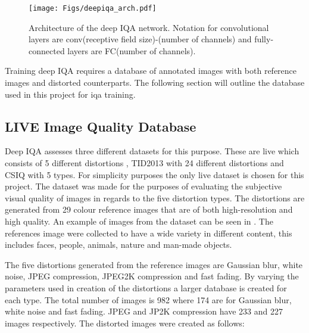 \documentclass[a4paper,twoside]{article}
\begin{document}
\begin{figure}[H]
  \centering
    \texttt{[image: Figs/deepiqa\_arch.pdf]}
      \caption{Architecture of the deep IQA network. Notation for convolutional layers are conv(receptive field size)-(number of channels) and fully-connected layers are FC(number of channels).}
    \label{fig:deepiqa_arch}
\end{figure}

Training deep IQA requires a database of annotated images with both reference images and distorted counterparts. The following section will outline the database used in this project for \gls{iqa} training.

\subsection{LIVE Image Quality Database}
Deep IQA assesses three different datasets for this purpose. These are \gls{live} which consists of 5 different distortions \cite{livepaper}, TID2013 \cite{tid2013} with 24 different distortions and CSIQ \cite{csiq} with 5 types. For simplicity purposes the only \gls{live} dataset is chosen for this project. The dataset was made for the purposes of evaluating the subjective visual quality of images in regards to the five distortion types. The distortions are generated from 29 colour reference images that are of both high-resolution and high quality. An example of images from the dataset can be seen in . The references image were collected to have a wide variety in different content, this includes faces, people, animals, nature and man-made objects.

The five distortions generated from the reference images are Gaussian blur, white noise, JPEG compression, JPEG2K compression and fast fading. By varying the parameters used in creation of the distortions a larger database is created for each type. The total number of images is 982 where 174 are for Gaussian blur, white noise and fast fading. JPEG and JP2K compression have 233 and 227 images respectively. The distorted images were created as follows:
\end{document}
